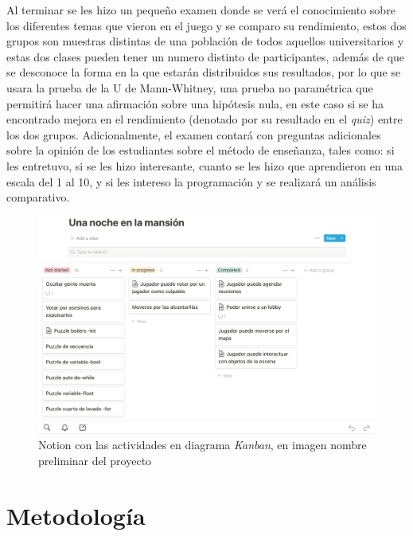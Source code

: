 Al terminar se les hizo un pequeño examen donde se verá el conocimiento sobre los diferentes temas que vieron en el juego y se comparo su rendimiento, estos dos grupos son muestras distintas de una población de todos aquellos universitarios y estas dos clases pueden tener un numero distinto de participantes, además de que se desconoce la forma en la que estarán distribuidos sus resultados, por lo que se usara la prueba de la U de Mann-Whitney, una prueba no paramétrica que permitirá hacer una afirmación sobre una hipótesis nula, en este caso si se ha encontrado mejora en el rendimiento (denotado por su resultado en el \textit{quiz}) entre los dos grupos.
Adicionalmente, el examen contará con preguntas adicionales sobre la opinión de los estudiantes sobre el método de enseñanza, tales como: si les entretuvo, si se les hizo interesante, cuanto se les hizo que aprendieron en una escala del 1 al 10, y si les intereso la programación y se realizará un análisis comparativo. 

\begin{figure}[h]
    \centering
    \includegraphics[width=0.8\linewidth]{images/notion.png}
    \caption{Notion con las actividades en diagrama \textit{Kanban}, en imagen nombre preliminar del proyecto}
    \label{fig:notion_proyecto}
\end{figure}

\section{Metodología}

